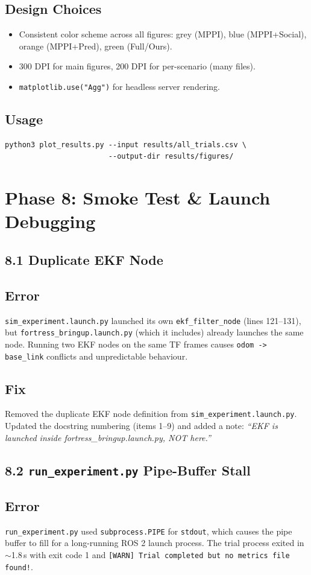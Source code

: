 \documentclass[11pt]{article}
\newcommand{\logentry}[1]{\subsection*{#1}}
\begin{document}
\logentry{Design Choices}
\begin{itemize}
  \item Consistent color scheme across all figures: grey (MPPI), blue
    (MPPI+Social), orange (MPPI+Pred), green (Full/Ours).
  \item 300 DPI for main figures, 200 DPI for per-scenario (many files).
  \item \texttt{matplotlib.use("Agg")} for headless server rendering.
\end{itemize}

\logentry{Usage}
\begin{verbatim}
python3 plot_results.py --input results/all_trials.csv \
                        --output-dir results/figures/
\end{verbatim}


\section*{Phase 8: Smoke Test \& Launch Debugging}

\subsection*{8.1 Duplicate EKF Node}

\logentry{Error}
\texttt{sim\_experiment.launch.py} launched its own \texttt{ekf\_filter\_node} (lines
121--131), but \texttt{fortress\_bringup.launch.py} (which it includes) already
launches the same node.  Running two EKF nodes on the same TF frames causes
\texttt{odom -> base\_link} conflicts and unpredictable behaviour.

\logentry{Fix}
Removed the duplicate EKF node definition from \texttt{sim\_experiment.launch.py}.
Updated the docstring numbering (items 1--9) and added a note:
\emph{``EKF is launched inside fortress\_bringup.launch.py, NOT here.''}


\subsection*{8.2 \texttt{run\_experiment.py} Pipe-Buffer Stall}

\logentry{Error}
\texttt{run\_experiment.py} used \texttt{subprocess.PIPE} for \texttt{stdout},
which causes the pipe buffer to fill for a long-running ROS 2 launch process.
The trial process exited in $\sim$1.8\,s with exit code 1 and
\texttt{[WARN] Trial completed but no metrics file found!}.
\end{document}
